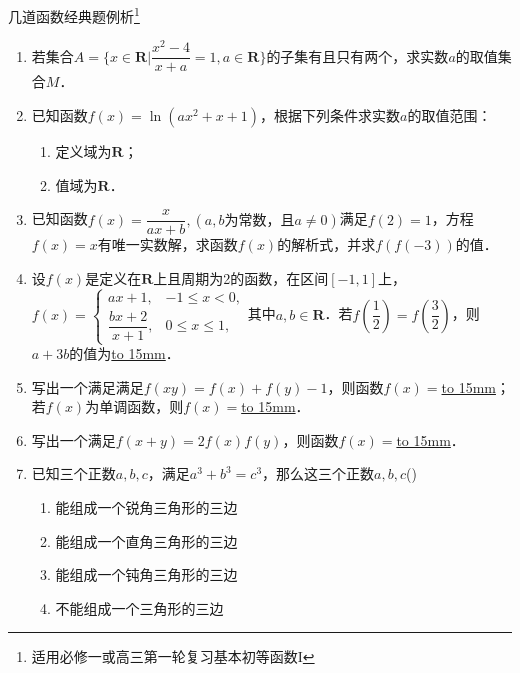 \documentclass[11pt,a4paper]{ctexart}
\begin{document}
\begin{center}
\heiti 几道函数经典题例析\footnote{\kaishu 适用必修一或高三第一轮复习基本初等函数I}
\end{center}
\begin{enumerate}[align=left,leftmargin=0pt,labelindent=1\parindent,listparindent=\parindent,labelwidth=0pt,itemindent=!,label= \textbf{题\arabic*：}]
\item 若集合$A=\{x\in \mathbf{R}|\dfrac{x^2-4}{x+a}=1,a\in\mathbf{R}\}$的子集有且只有两个，求实数$a$的取值集合$M$．


\vfill

\item 已知函数$f(x)=\ln (ax^2+x+1)$，根据下列条件求实数$a$的取值范围：
\begin{enumerate}[align=left,leftmargin=0pt,labelindent=0.75\parindent,listparindent=\parindent,labelwidth=0pt,itemindent=!,label= （\arabic*）]
\item 定义域为$\mathbf{R}$；
\item 值域为$\mathbf{R}$．
\end{enumerate}
\vfill

\item 已知函数$f(x)=\dfrac x{ax+b},(a,b\text{为常数，且}a\ne0)$满足$f(2)=1$，方程$f(x)=x$有唯一实数解，求函数$f(x)$的解析式，并求$f(f(-3))$的值．
\vfill
\newpage



\item 设$f(x)$是定义在$\mathbf{R}$上且周期为2的函数，在区间$[-1,1]$上，\( f(x)=\begin{cases}ax+1,&-1\le x <0,\\ \dfrac{bx+2}{x+1},&0\le x\le1, \end{cases} \)其中$a,b\in \mathbf{R}$．若$f(\dfrac12)=f(\dfrac32)$，则$a+3b$的值为\underline{\hbox to 15mm{}}．

\vfill

\item 写出一个满足满足$f(xy)=f(x)+f(y)-1$，则函数$f(x)= $\underline{\hbox to 15mm{}}；若$f(x)$为单调函数，则$f(x)=$\underline{\hbox to 15mm{}}．

\bigskip
\bigskip

\item 写出一个满足$f(x+y)=2f(x)f(y)$，则函数$f(x)= $\underline{\hbox to 15mm{}}．


\bigskip
\bigskip



\item 已知三个正数$a,b,c$，满足$a^3+b^3=c^3$，那么这三个正数$a,b,c$\mbox{(\hspace{1cm})}
\begin{enumerate}[align=left,leftmargin=0pt,labelindent=\parindent,listparindent=\parindent,labelwidth=0pt,itemindent=!,label= \Alph*．]
\item 能组成一个锐角三角形的三边
\item 能组成一个直角三角形的三边
\item 能组成一个钝角三角形的三边
\item 不能组成一个三角形的三边
\end{enumerate}
\vfill


\end{enumerate}
\end{document}
